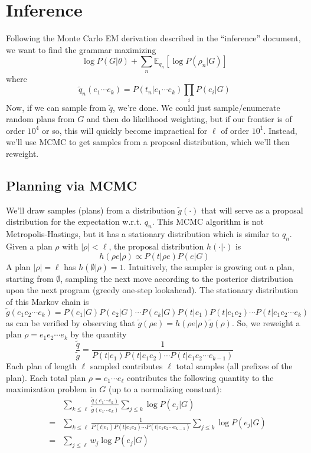 \documentclass{article}
\begin{document}
\section{Inference}
Following the Monte Carlo EM derivation described in the ``inference'' document, we want to find the grammar maximizing
$$
\log P(G|\theta)+\sum_n \mathbb{E}_{q_n}\left[ \log P(\rho_n | G) \right]
$$
where
$$
\tilde{q}_n(e_1\cdots e_k) = P(t_n | e_1\cdots e_k)\prod_i P(e_i | G)
$$
Now, if we can sample from $\tilde{q}$, we're done.
We could just sample/enumerate random plans from $G$ and then do likelihood weighting, but if our frontier is of order $10^4$ or so, this will quickly become impractical for $\ell$ of order $10^1$.
Instead, we'll use MCMC to get samples from a proposal distribution, which we'll then reweight.
\subsection{Planning via MCMC}
We'll draw samples (plans) from a distribution $\tilde{g}(\cdot)$ that will serve as a proposal distribution for the expectation w.r.t. $q_n$.
This MCMC algorithm is not Metropolis-Hastings, but it has a stationary distribution which is similar to $q_n$.
Given a plan $\rho$ with $|\rho|<\ell$, the proposal distribution $h(\cdot | \cdot)$ is
$$
h(\rho e | \rho) \propto P(t|\rho e) P(e|G)
$$
A plan $|\rho|=\ell$ has $h(\emptyset | \rho)=1$.
Intuitively, the sampler is growing out a plan, starting from $\emptyset$, sampling the next move according to the posterior distribution upon the next program (greedy one-step lookahead).
The stationary distribution of this Markov chain is
$$
\tilde{g} (e_1 e_2 \cdots e_k) = P(e_1 | G) P(e_2 | G) \cdots P(e_k | G) P(t | e_1) P(t | e_1e_2) \cdots P(t | e_1e_2\cdots e_k)
$$
as can be verified by observing that $\tilde{g}(\rho e)=h(\rho e | \rho) \tilde{g}(\rho)$.
So, we reweight a plan $\rho=e_1e_2\cdots e_k$ by the quantity
$$
\frac{\tilde{q}}{\tilde{g}} = \frac{1}{P(t|e_1)P(t|e_1e_2)\cdots P(t|e_1e_2\cdots e_{k-1})}
$$
Each plan of length $\ell$ sampled contributes $\ell$ total samples (all prefixes of the plan).
Each total plan $\rho=e_1\cdots e_\ell$ contributes the following quantity to the maximization problem in $G$ (up to a normalizing constant):
\begin{eqnarray*}
&&\sum_{k\leq\ell} \frac{\tilde{q}(e_1\cdots e_k)}{\tilde{g}(e_1\cdots e_k)} \sum_{j\leq k} \log P(e_j | G)\\
&=&\sum_{k\leq\ell} \frac{1}{P(t|e_1)P(t|e_1e_2)\cdots P(t|e_1e_2\cdots e_{k-1})} \sum_{j\leq k} \log P(e_j | G)\\
&=&\sum_{j\leq \ell} w_j\log P(e_j | G)
\end{eqnarray*}
\end{document}
